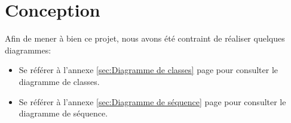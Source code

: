 \section{Conception}
\label{sec:Conception}
  \par Afin de mener à bien ce projet, nous avons été contraint de réaliser quelques diagrammes:
  \begin{itemize}
    \item Se référer à l'annexe \ref{sec:Diagramme de classes} page \pageref{sec:Diagramme de classes} pour consulter le diagramme de classes.
    \item Se référer à l'annexe \ref{sec:Diagramme de séquence} page \pageref{sec:Diagramme de séquence} pour consulter le diagramme de séquence.
  \end{itemize}
\pagebreak
